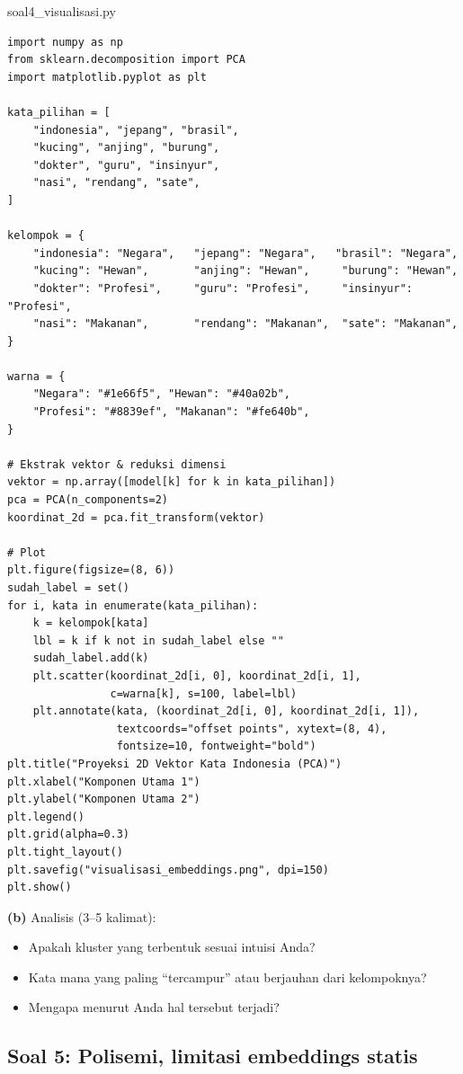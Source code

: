 \documentclass[12pt, a4paper]{article}
\begin{document}
\begin{codewindow}{soal4\_visualisasi.py}
\begin{lstlisting}[style=pycode]
import numpy as np
from sklearn.decomposition import PCA
import matplotlib.pyplot as plt

kata_pilihan = [
    "indonesia", "jepang", "brasil",
    "kucing", "anjing", "burung",
    "dokter", "guru", "insinyur",
    "nasi", "rendang", "sate",
]

kelompok = {
    "indonesia": "Negara",   "jepang": "Negara",   "brasil": "Negara",
    "kucing": "Hewan",       "anjing": "Hewan",     "burung": "Hewan",
    "dokter": "Profesi",     "guru": "Profesi",     "insinyur": "Profesi",
    "nasi": "Makanan",       "rendang": "Makanan",  "sate": "Makanan",
}

warna = {
    "Negara": "#1e66f5", "Hewan": "#40a02b",
    "Profesi": "#8839ef", "Makanan": "#fe640b",
}

# Ekstrak vektor & reduksi dimensi
vektor = np.array([model[k] for k in kata_pilihan])
pca = PCA(n_components=2)
koordinat_2d = pca.fit_transform(vektor)

# Plot
plt.figure(figsize=(8, 6))
sudah_label = set()
for i, kata in enumerate(kata_pilihan):
    k = kelompok[kata]
    lbl = k if k not in sudah_label else ""
    sudah_label.add(k)
    plt.scatter(koordinat_2d[i, 0], koordinat_2d[i, 1],
                c=warna[k], s=100, label=lbl)
    plt.annotate(kata, (koordinat_2d[i, 0], koordinat_2d[i, 1]),
                 textcoords="offset points", xytext=(8, 4),
                 fontsize=10, fontweight="bold")
plt.title("Proyeksi 2D Vektor Kata Indonesia (PCA)")
plt.xlabel("Komponen Utama 1")
plt.ylabel("Komponen Utama 2")
plt.legend()
plt.grid(alpha=0.3)
plt.tight_layout()
plt.savefig("visualisasi_embeddings.png", dpi=150)
plt.show()
\end{lstlisting}
\end{codewindow}

\textbf{(b)} Analisis (3--5 kalimat):
\begin{itemize}
  \item Apakah kluster yang terbentuk sesuai intuisi Anda?
  \item Kata mana yang paling ``tercampur'' atau berjauhan dari kelompoknya?
  \item Mengapa menurut Anda hal tersebut terjadi?
\end{itemize}

\subsection{Soal 5: Polisemi, limitasi embeddings statis}
\label{sec:soal5}
\end{document}
